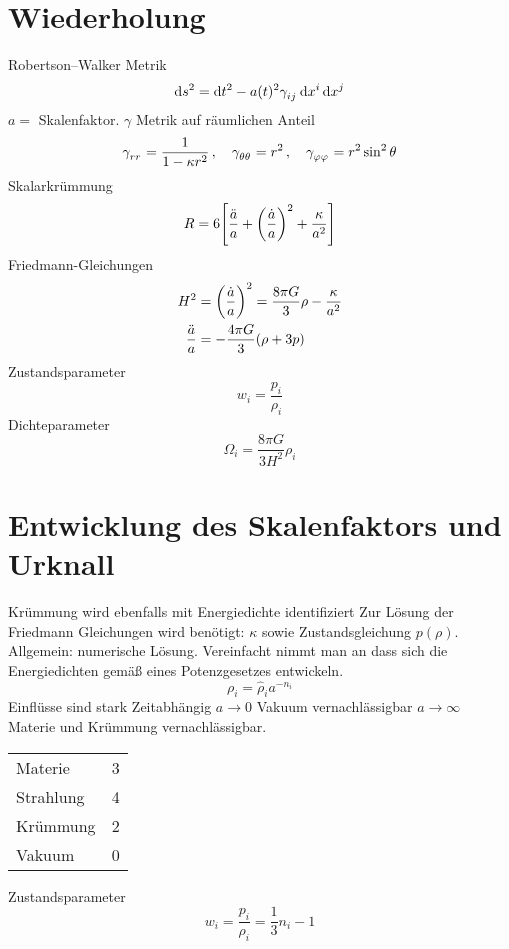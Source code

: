 \documentclass[10pt,oneside,a4paper]{scrartcl}
\let\originalleft\left  %
\let\originalright\right
\renewcommand{\left}{\mathopen{}\mathclose\bgroup\originalleft}
\renewcommand{\right}{\aftergroup\egroup\originalright}
\theoremstyle{definition}
\theoremstyle{remark}
\begin{document}
\section{Wiederholung}
Robertson–Walker Metrik
\begin{equation}
\dif s^2=\dif
t^2-a(t)^2\tensor{\gamma}{_i_j}\dif\tensor{x}{^i}\dif\tensor{x}{^j}
\end{equation}
$a=$ Skalenfaktor. $\gamma$ Metrik auf räumlichen Anteil
\begin{equation}
\tensor{\gamma}{_r_r}=\frac{1}{1-\kappa r^2}\,,
\quad\tensor{\gamma}{_\theta_\theta}=r^2\,,
\quad\tensor{\gamma}{_\varphi_\varphi}=r^2\sin^2\theta 
\end{equation}
Skalarkrümmung
\begin{equation}
R=6\left[\frac{\ddot{a}}{a}+\left(\frac{\dot{a}}{a}\right)^2+\frac{\kappa}{a^2}\right]
\end{equation}
Friedmann-Gleichungen
\begin{align}
H^2&=\left(\frac{\dot{a}}{a}\right)^2
=\frac{8\pi G}{3}\rho-\frac{\kappa}{a^2}
\\
\frac{\ddot{a}}{a}
&=-\frac{4\pi G}{3}\left(\rho+3p\right)
\end{align}
Zustandsparameter
\begin{equation}
w_i=\frac{p_i}{\rho_i}
\end{equation}
Dichteparameter
\begin{equation}
\Omega_i=\frac{8\pi G}{3H^2}\rho_i
\end{equation}
\section{Entwicklung des Skalenfaktors und Urknall}
Krümmung wird ebenfalls mit Energiedichte identifiziert
Zur Lösung der Friedmann Gleichungen wird benötigt:
$\kappa$ sowie Zustandsgleichung $p(\rho)$. Allgemein: numerische Lösung.
Vereinfacht nimmt man an dass sich die Energiedichten gemäß eines Potenzgesetzes
entwickeln.
\begin{equation}
\rho_i=\hat{\rho}_i a^{-n_i}
\end{equation}
Einflüsse sind stark Zeitabhängig $a\to 0$ Vakuum vernachlässigbar $a\to \infty$
Materie und Krümmung vernachlässigbar.
\begin{table}
\centering
\begin{tabular}{lr}
\toprule
Materie& 3\\
Strahlung&4\\
Krümmung&2\\
Vakuum&0\\
\bottomrule
\end{tabular}
\end{table}
Zustandsparameter 
\begin{equation}
w_i=\frac{p_i}{\rho_i}=\frac{1}{3}n_i-1
\end{equation}
\end{document}
